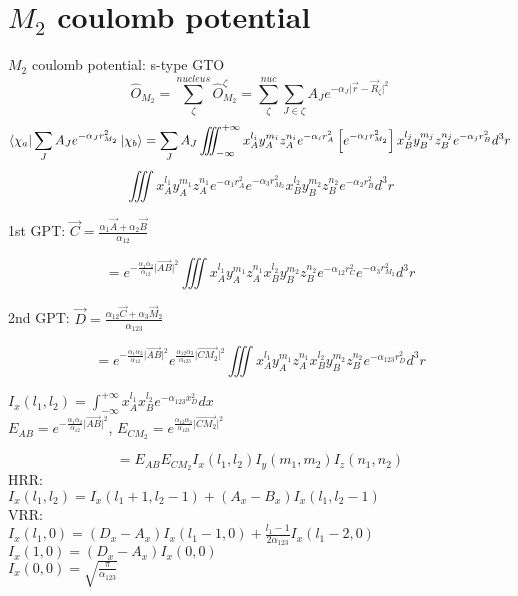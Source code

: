 \documentclass{article}
\begin{document}
\newpage
\section{$M_2$ coulomb potential}
	$M_2$ coulomb  potential: s-type GTO
	\begin{displaymath}
		\hat{O}_{M_2}=\sum_{\zeta}^{nucleus} \hat{O}^{\zeta}_{M_2}
		=\sum_{\zeta}^{nuc} \sum_{J\in\zeta} A_J e^{-\alpha_J \vert \vec{r}-\vec{R}_\zeta \vert^2} 
	\end{displaymath}
	\begin{displaymath}
		\bra{\chi_a} \sum_J A_J e^{-\alpha_J r_{M_2}^2} \ket{\chi_b}
		=\sum_J A_J \iiint_{-\infty}^{+\infty} x^{l_i}_A y^{m_i}_A z^{n_i}_A e^{-\alpha_i r^2_A}
		\left[e^{-\alpha_I r_{M_2}^2}\right] x_B^{l_j} y_B^{m_j} z_B^{n_j} e^{-\alpha_j r_B^2} d^3r 
	\end{displaymath}
	\begin{displaymath}
		\iiint x^{l_1}_A y^{m_1}_A z^{n_1}_A e^{-\alpha_1 r^2_A} 
		e^{-\alpha_3 r_{M_2}^2} x_B^{l_2} y_B^{m_2} z_B^{n_2} e^{-\alpha_2 r_B^2} d^3r
	\end{displaymath}
	\begin{center}
		1st GPT: $	\vec{C}=\frac{\alpha_1\vec{A}+\alpha_2\vec{B}}{\alpha_{12}}	$
	\end{center}
	\begin{displaymath}
		=e^{-\frac{\alpha_1\alpha_2}{\alpha_{12}} \vert \overrightarrow{AB} \vert^2}
		\iiint x^{l_1}_A y^{m_1}_A z^{n_1}_A x_B^{l_2} y_B^{m_2} z_B^{n_2} 
		e^{-\alpha_{12} r_C^2} e^{-\alpha_3 r_{M_2}^2} d^3r
	\end{displaymath}
	\begin{center}
		2nd GPT: $	\vec{D}=\frac{\alpha_{12}\vec{C}+\alpha_3 \vec{M}_2}{\alpha_{123}}	$
	\end{center}
	\begin{displaymath}
		=e^{-\frac{\alpha_1\alpha_2}{\alpha_{12}} \vert \overrightarrow{AB} \vert^2}
		e^{\frac{\alpha_{12}\alpha_3}{\alpha_{123}} \vert \overrightarrow{CM_2} \vert^2}
		\iiint x^{l_1}_A y^{m_1}_A z^{n_1}_A x_B^{l_2} y_B^{m_2} z_B^{n_2} e^{-\alpha_{123}r_D^2} d^3r
	\end{displaymath}
	\begin{center}
		$	I_x(l_1,l_2)=\int^{+\infty}_{-\infty} x_A^{l_1} x_B^{l_2} e^{-\alpha_{123}x_D^2} dx		$\\
		$	E_{AB}=e^{-\frac{\alpha_1\alpha_2}{\alpha_{12}} \vert \overrightarrow{AB} \vert^2}	$,
		$	E_{CM_2}=e^{\frac{\alpha_{12}\alpha_3}{\alpha_{123}} \vert \overrightarrow{CM_2} \vert^2}	$
	\end{center}
	\begin{displaymath}
		=E_{AB}E_{CM_2} I_x(l_1,l_2) I_y(m_1,m_2) I_z(n_1,n_2)
	\end{displaymath}
	HRR:\\
		$	I_x(l_1,l_2)=I_x(l_1+1,l_2-1)+(A_x-B_x)I_x(l_1,l_2-1)	$\\
	VRR:\\
		$	I_x(l_1,0)=(D_x-A_x)I_x(l_1-1,0)+\frac{l_1-1}{2\alpha_{123}}I_x(l_1-2,0)	$\\
		$	I_x(1,0)=(D_x-A_x)I_x(0,0)	$\\
		$	I_x(0,0)=\sqrt{\frac{\pi}{\alpha_{123}}}	$
		
\end{document}
